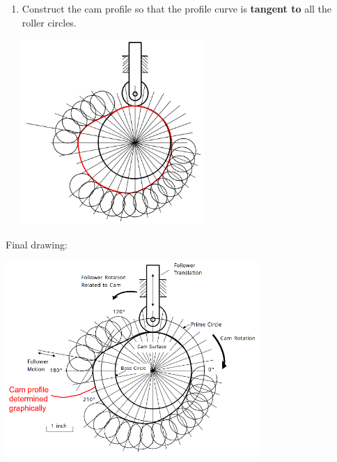 \documentclass[11pt]{article}
\begin{document}
\begin{enumerate}
\item Construct the cam profile so that the profile curve is \textbf{tangent to} all the roller circles.
\begin{center}
\includegraphics[height=19em]{./images/graphical-construction-of-cam-construct-cam-profile.png}
\end{center}
\end{enumerate}

Final drawing:
\begin{center}
\includegraphics[height=20em]{./images/graphical-construction-of-cam-final-drawing.png}
\end{center}
\end{document}
